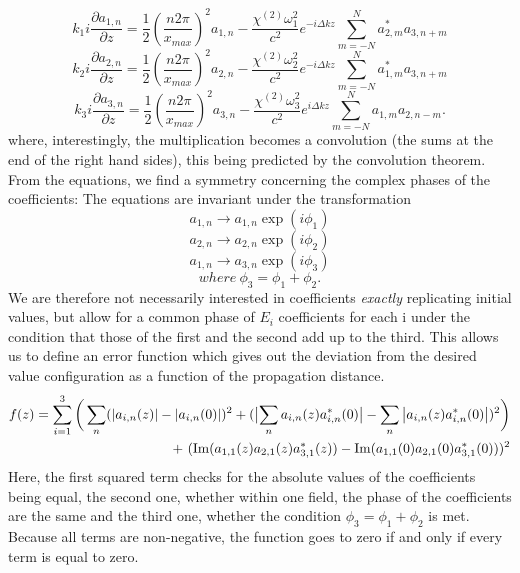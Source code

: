 \documentclass{article}
\begin{document}
\begin{equation}
k_1 i\frac{\partial a_{1, n}} {\partial z}=\frac{1}{2}(\frac{n 2 \pi}{x_{max}})^2 a_{1, n}-\frac{\chi^{(2)} \omega_1^2}{c^2}  e^{-i\Delta k z} \sum_{m=-N}^{N} a_{2, m}^* a_{3, n+m}
\end{equation}
\begin{equation}
k_2 i\frac{\partial a_{2, n}} {\partial z}=\frac{1}{2}(\frac{n 2 \pi}{x_{max}})^2 a_{2, n}-\frac{\chi^{(2)} \omega_2^2}{c^2} e^{-i\Delta k z} \sum_{m=-N}^{N} a_{1, m}^* a_{3, n+m} 
\end{equation}
\begin{equation}
k_3 i\frac{\partial a_{3, n}} {\partial z}=\frac{1}{2}(\frac{n 2 \pi}{x_{max}})^2 a_{3, n}-\frac{\chi^{(2)} \omega_3^2}{c^2} e^{i\Delta k z} \sum_{m=-N}^{N} a_{1, m} a_{2, n-m}. 
\end{equation}
where, interestingly, the multiplication becomes a convolution (the sums at the end of the right hand sides), this being predicted by the convolution theorem. From the equations, we find a symmetry concerning the complex phases of the coefficients: The equations are invariant under the transformation 
$$a_{1, n} \longrightarrow a_{1, n} \exp(i \phi_1)$$
$$a_{2, n} \longrightarrow a_{2, n} \exp(i \phi_2)$$
$$a_{1, n} \longrightarrow a_{3, n} \exp(i \phi_3)$$
$$where \ \phi_3=\phi_1+\phi_2.$$
We are therefore not necessarily interested in coefficients \emph{exactly} replicating initial values, but allow for a common phase of $E_i$ coefficients for each i under the condition that those of the first and the second add up to the third. This allows us to define an error function which gives out the deviation from the desired value configuration as a function of the propagation distance.
\begin{align}
\nonumber f(z)=\sum_{i=1}^{3}\bigg(\sum_{n} (\abs{a_{i, n}(z)} -\abs{a_{i, n}(0)})^2+(\bigl|\sum_n a_{i, n}(z) a_{i, n}^*(0) \bigr|-\sum_n\abs{ a_{i, n}(z) a_{i, n}^*(0)})^2\bigg) \\ +\ (\Im(a_{1,1}(z) a_{2,1}(z) a_{3,1}^*(z))-\Im(a_{1,1}(0) a_{2,1}(0) a_{3,1}^*(0)))^2
\end{align}
Here, the first squared term checks for the absolute values of the coefficients being equal, the second one, whether within one field, the phase of the coefficients are the same and the third one, whether the condition  $\phi_3=\phi_1+\phi_2$ is met. Because all terms are non-negative, the function goes to zero if and only if every term is equal to zero.
\end{document}
